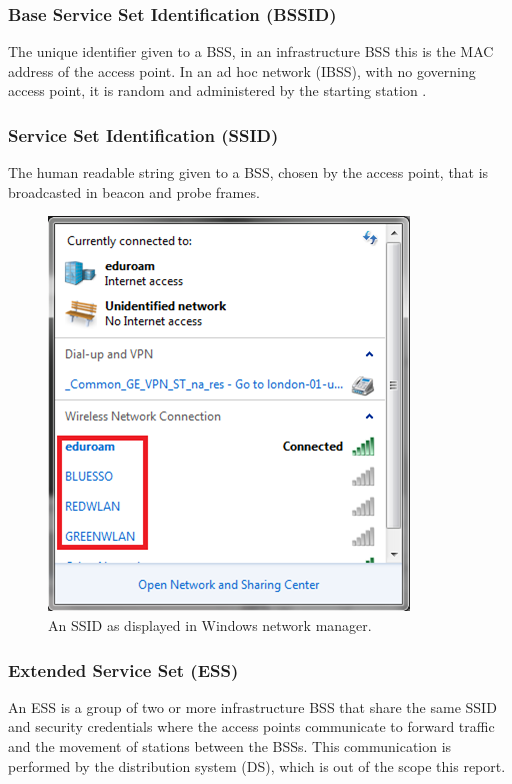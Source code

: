 \subsubsection*{Base Service Set Identification (BSSID)}
The unique identifier given to a BSS, in an infrastructure BSS this is the MAC address of the access point. In an ad hoc network (IBSS), with no governing access point, it is random and administered by the starting station \cite{intro:ieee_tutorial}.

\subsubsection*{Service Set Identification (SSID)}
The human readable  string given to a BSS, chosen by the access point, that is broadcasted in beacon and probe frames.
\newpage 
\begin{figure}[htb!]
\centering\includegraphics{intro/diagrams/ssid.png}
\caption{An SSID as displayed in Windows network manager.}
\end{figure}

\subsubsection*{Extended Service Set (ESS)}
An ESS is a group of two or more infrastructure BSS that share the same SSID and security credentials where the access points communicate to forward traffic and the movement of stations between the BSSs. This communication is performed by the distribution system (DS), which is out of the scope this report.

